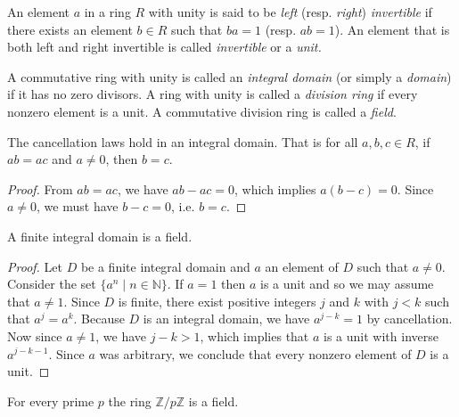 \begin{definition}
    An element \(a\) in a ring \(R\) with unity is said to be \emph{left} (resp.
    \emph{right}) \emph{invertible} if there exists an element \(b \in R\) such
    that \(ba = 1\) (resp. \(ab = 1\)). An element that is both left and right
    invertible is called \emph{invertible} or a \emph{unit.}
\end{definition}

\begin{definition}
    A commutative ring with unity is called an \emph{integral domain} (or simply
    a \emph{domain}) if it has no zero divisors. A ring with unity is called a
    \emph{division ring} if every nonzero element is a unit. A commutative
    division ring is called a \emph{field}.
\end{definition}

\begin{theorem}
    The cancellation laws hold in an integral domain. That is for all \(a, b, c
    \in R\), if \(ab = ac\) and \(a \neq 0\), then \(b = c\).
\end{theorem}

\begin{proof}
    From \(ab = ac\), we have \(ab - ac = 0\), which implies \(a(b - c) = 0\).
    Since \(a \neq 0\), we must have \(b - c = 0\), i.e. \(b = c\).
\end{proof}

\begin{theorem}
    A finite integral domain is a field.
    \label{thm:finite-integral-domain-field}
\end{theorem}

\begin{proof}
    Let \(D\) be a finite integral domain and \(a\) an element of \(D\) such
    that \(a \neq 0\). Consider the set \(\{a^n \mid n \in \mathbb{N}\}\). If
    \(a = 1\) then \(a\) is a unit and so we may assume that \(a \neq 1\). Since
    \(D\) is finite, there exist positive integers \(j\) and \(k\) with \(j <
    k\) such that \(a^j = a^k\). Because \(D\) is an integral domain, we have
    \(a^{j-k} = 1\) by cancellation. Now since \(a \neq 1\), we have \(j - k >
    1\), which implies that \(a\) is a unit with inverse \(a^{j-k-1}\). Since
    \(a\) was arbitrary, we conclude that every nonzero element of \(D\) is a
    unit.
\end{proof}

\begin{theorem}
    For every prime \(p\) the ring \(\mathbb{Z}/p\mathbb{Z}\) is a field.
\end{theorem}

